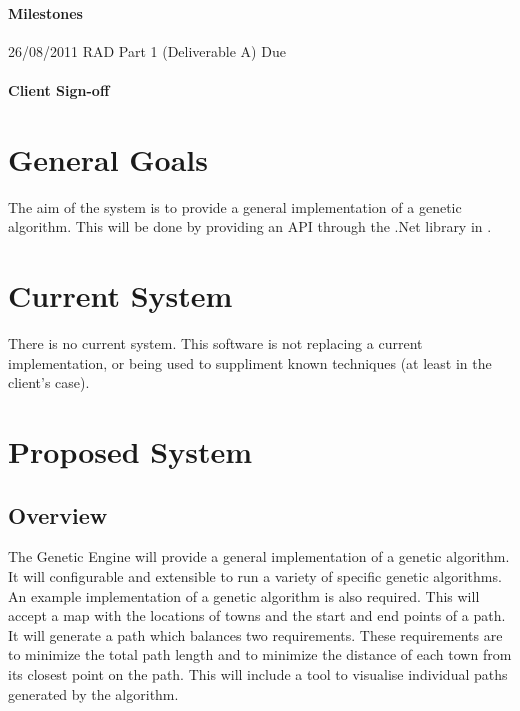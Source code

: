 \paragraph*{Milestones}
26/08/2011 RAD Part 1 (Deliverable A) Due

\paragraph*{Client Sign-off}

\clearpage


%
%
\section{General Goals}
The aim of the system is to provide a general implementation of a genetic algorithm. 
This will be done by providing an API through the .Net library in \csharp. 


%
%
\section{Current System}
There is no current system. %
This software is not replacing a current implementation, or being used to suppliment known techniques (at least in the client's case).


%
%

\section{Proposed System}
\subsection{Overview}
The Genetic Engine will provide a general implementation of a genetic algorithm. It will configurable and extensible to run a variety of specific genetic algorithms.
An example implementation of a genetic algorithm is also required. This will accept a map with the locations of towns and the start and end points of a path. It will generate a path which balances two requirements. These requirements are to minimize the total path length and to minimize the distance of each town from its closest point on the path. This will include a tool to visualise individual paths generated by the algorithm.

